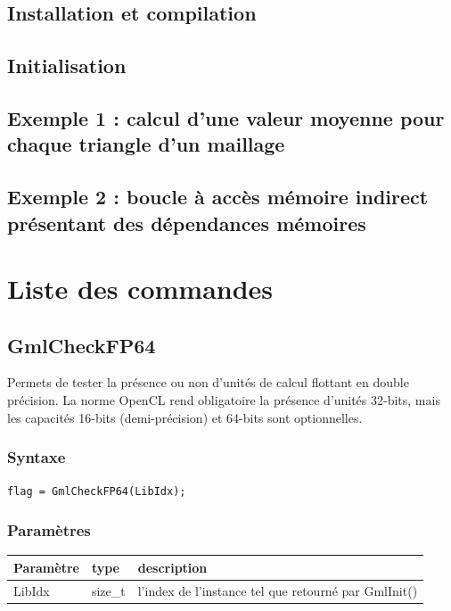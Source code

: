 \documentclass[a4paper,12pt]{article}
\begin{document}
\subsection{Installation et compilation}

\subsection{Initialisation}

\subsection{Exemple 1 : calcul d'une valeur moyenne pour chaque triangle d'un maillage}

\subsection{Exemple 2 : boucle à accès mémoire indirect présentant des dépendances mémoires}


%
%

\section{Liste des commandes}

\subsection{GmlCheckFP64}

Permets de tester la présence ou non d'unités de calcul flottant en double précision.
La norme OpenCL rend obligatoire la présence d'unités 32-bits, mais les capacités 16-bits (demi-précision) et 64-bits sont optionnelles.

\subsubsection*{Syntaxe}
{\tt flag = GmlCheckFP64(LibIdx);}
\subsubsection*{Paramètres}

\begin{tabular}{|m{2cm}|m{1.5cm}|m{10.5cm}|}
\hline
Paramètre  & type    & description \\
\hline
LibIdx     & size\_t & l'index de l'instance tel que retourné par GmlInit() \\
\hline
\end{tabular}
\end{document}
